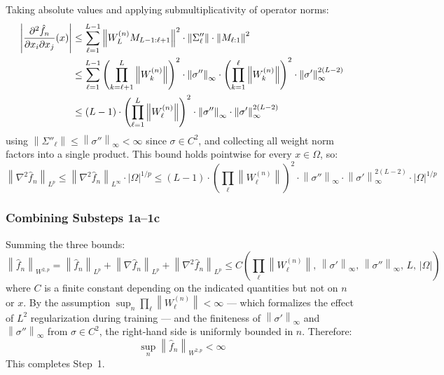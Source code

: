 \documentclass[12pt]{article}
\newcommand{\norm}[1]{\left\| #1 \right\|}
\newcommand{\fn}{\hat{f}_n}
\newcommand{\abs}[1]{\left| #1 \right|}
\begin{document}
	Taking absolute values and applying submultiplicativity of operator norms:
	\begin{align}
		\abs{\frac{\partial^2 \fn}{\partial x_i \partial x_j}(x)}
		&\leq \sum_{\ell=1}^{L-1}
		\norm{W_L^{(n)} M_{L-1:\ell+1}}^2 \cdot
		\norm{\Sigma''_\ell} \cdot
		\norm{M_{\ell:1}}^2 \notag \\
		&\leq \sum_{\ell=1}^{L-1}
		\left(\prod_{k=\ell+1}^{L} \norm{W_k^{(n)}}\right)^2 \cdot
		\norm{\sigma''}_\infty \cdot
		\left(\prod_{k=1}^{\ell} \norm{W_k^{(n)}}\right)^2 \cdot
		\norm{\sigma'}_\infty^{2(L-2)} \notag \\
		&\leq (L-1) \cdot \left(\prod_{\ell=1}^{L} \norm{W_\ell^{(n)}}\right)^2
		\cdot \norm{\sigma''}_\infty \cdot \norm{\sigma'}_\infty^{2(L-2)}
	\end{align}
	using $\norm{\Sigma''_\ell} \leq \norm{\sigma''}_\infty < \infty$ since
	$\sigma \in C^2$, and collecting all weight norm factors into a single
	product. This bound holds pointwise for every $x \in \Omega$, so:
	\begin{equation}
		\norm{\nabla^2 \fn}_{L^p}
		\leq \norm{\nabla^2 \fn}_{L^\infty} \cdot |\Omega|^{1/p}
		\leq (L-1) \cdot \left(\prod_\ell \norm{W_\ell^{(n)}}\right)^2
		\cdot \norm{\sigma''}_\infty \cdot \norm{\sigma'}_\infty^{2(L-2)}
		\cdot |\Omega|^{1/p}
	\end{equation}
	
	\subsubsection*{Combining Substeps 1a--1c}
	
	Summing the three bounds:
	\begin{equation}
		\norm{\fn}_{W^{2,p}}
		= \norm{\fn}_{L^p} + \norm{\nabla \fn}_{L^p} + \norm{\nabla^2 \fn}_{L^p}
		\leq C\!\left(\prod_\ell \norm{W_\ell^{(n)}},\,
		\norm{\sigma'}_\infty,\, \norm{\sigma''}_\infty,\, L,\, |\Omega|\right)
	\end{equation}
	where $C$ is a finite constant depending on the indicated quantities but not
	on $n$ or $x$. By the assumption $\sup_n \prod_\ell \norm{W_\ell^{(n)}}
	< \infty$ --- which formalizes the effect of $L^2$ regularization during
	training \citep{bartlett2017spectrally} --- and the finiteness of
	$\norm{\sigma'}_\infty$ and $\norm{\sigma''}_\infty$ from $\sigma \in C^2$,
	the right-hand side is uniformly bounded in $n$. Therefore:
	\begin{equation}
		\sup_n \norm{\fn}_{W^{2,p}} < \infty
	\end{equation}
	This completes Step~1.
	
\end{document}
